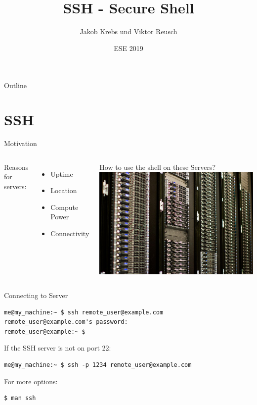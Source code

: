 \documentclass[10pt,graphics,aspectratio=169,table]{beamer}
\title{SSH - Secure Shell}
\author{Jakob Krebs und Viktor Reusch}
\date{ESE 2019}
\institute{NERD101 - ESE - ifsr - TU Dresden}
\begin{document}
\maketitle
\begin{frame}{Outline}
    \tableofcontents
\end{frame}

\section{SSH}
\begin{frame}{Motivation}
\begin{columns}
        Reasons for servers:
        \begin{itemize}
            \item Uptime
            \item Location
            \item Compute Power
            \item Connectivity
        \end{itemize}
        How to use the shell on these Servers?
        \includegraphics[width=\textwidth]{img/servers.jpg} \cite{servers}
\end{columns}
\end{frame}

\begin{frame}[fragile]{Connecting to Server}
\begin{lstlisting}
me@my_machine:~ $ ssh remote_user@example.com
remote_user@example.com's password:
remote_user@example:~ $
\end{lstlisting}

If the SSH server is not on port 22:
\begin{lstlisting}
me@my_machine:~ $ ssh -p 1234 remote_user@example.com
\end{lstlisting}

For more options:
\begin{lstlisting}
$ man ssh
\end{lstlisting}
\end{frame}
\end{document}

